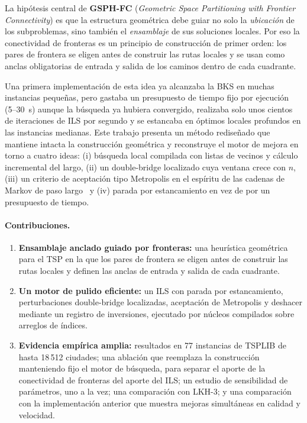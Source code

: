 \documentclass[runningheads]{llncs}
\begin{document}
La hipótesis central de \textbf{GSPH-FC} (\textit{Geometric Space
Partitioning with Frontier Connectivity}) es que la estructura
geométrica debe guiar no solo la \emph{ubicación} de los subproblemas,
sino también el \emph{ensamblaje} de sus soluciones locales. Por eso la
conectividad de fronteras es un principio de construcción de primer
orden: los pares de frontera se eligen antes de construir las rutas
locales y se usan como anclas obligatorias de entrada y salida de los
caminos dentro de cada cuadrante.

Una primera implementación de esta idea ya alcanzaba la BKS en muchas
instancias pequeñas, pero gastaba un presupuesto de tiempo fijo por
ejecución (5--30~s) aunque la búsqueda ya hubiera convergido, realizaba
solo unos cientos de iteraciones de ILS por segundo y se estancaba en
óptimos locales profundos en las instancias medianas. Este trabajo
presenta un método rediseñado que mantiene intacta la construcción
geométrica y reconstruye el motor de mejora en torno a cuatro ideas:
(i) búsqueda local compilada con listas de vecinos y cálculo incremental
del largo, (ii) un double-bridge localizado cuya ventana crece con $n$,
(iii) un criterio de aceptación tipo Metropolis en el espíritu de las
cadenas de Markov de paso
largo~\cite{martin1991large,kirkpatrick1983optimization} y (iv) parada
por estancamiento en vez de por un presupuesto de tiempo.

\paragraph{Contribuciones.}
\begin{enumerate}
  \item \textbf{Ensamblaje anclado guiado por fronteras:} una heurística
    geométrica para el TSP en la que los pares de frontera se eligen
    antes de construir las rutas locales y definen las anclas de entrada
    y salida de cada cuadrante.
  \item \textbf{Un motor de pulido eficiente:} un ILS con parada por
    estancamiento, perturbaciones double-bridge localizadas, aceptación
    de Metropolis y deshacer mediante un registro de inversiones,
    ejecutado por núcleos compilados sobre arreglos de índices.
  \item \textbf{Evidencia empírica amplia:} resultados en 77 instancias
    de TSPLIB de hasta 18\,512 ciudades; una ablación que reemplaza la
    construcción manteniendo fijo el motor de búsqueda, para separar el
    aporte de la conectividad de fronteras del aporte del ILS; un estudio
    de sensibilidad de parámetros, uno a la vez; una comparación con
    LKH-3; y una comparación con la implementación anterior que muestra
    mejoras simultáneas en calidad y velocidad.
\end{enumerate}
\end{document}
